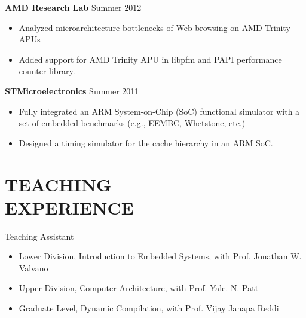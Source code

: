 \documentclass[margin, 9pt]{res} %
\begin{document}
\begin{resume}
\medskip
{\textbf{AMD Research Lab}} \hfill{Summer 2012}\\
\vspace*{-10pt}
\begin{itemize}[leftmargin=*] \itemsep -3pt
\vspace*{-5pt}
	\item Analyzed microarchitecture bottlenecks of Web browsing on AMD Trinity APUs
	\item Added support for AMD Trinity APU in libpfm and PAPI performance counter library.
\end{itemize}

\medskip
{\textbf{STMicroelectronics}} \hfill{Summer 2011}\\
\vspace*{-10pt}
\begin{itemize}[leftmargin=*] \itemsep -3pt
\vspace*{-5pt}
	\item Fully integrated an ARM System-on-Chip (SoC) functional simulator with a set of embedded benchmarks (e.g., EEMBC, Whetstone, etc.)
	\item Designed a timing simulator for the cache hierarchy in an ARM SoC.
\end{itemize}


\section{TEACHING\\ EXPERIENCE} 

{\large{Teaching Assistant}}\\
\vspace*{-5pt}
\begin{itemize}[leftmargin=*] \itemsep -2pt
\vspace*{-5pt}
	\item Lower Division, Introduction to Embedded Systems, with Prof. Jonathan W. Valvano
	\item Upper Division, Computer Architecture, with Prof. Yale. N. Patt
	\item Graduate Level, Dynamic Compilation, with Prof. Vijay Janapa Reddi
\end{itemize}



\end{resume}
\end{document}
